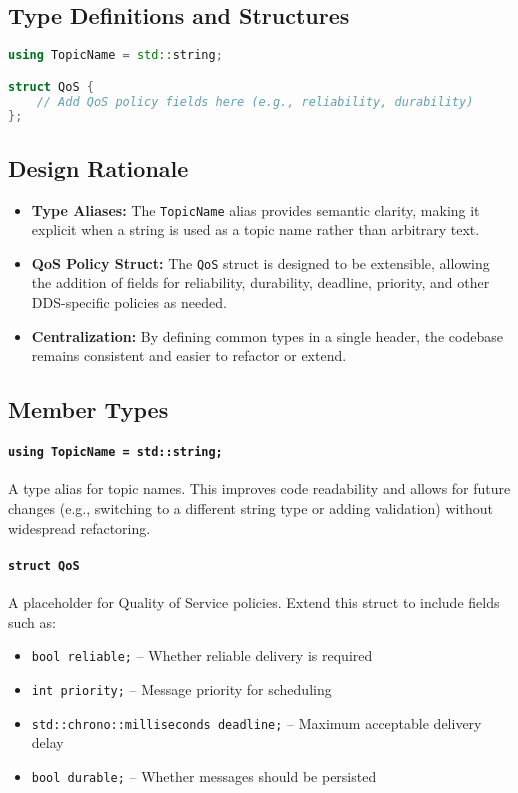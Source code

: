 \documentclass[12pt]{report}
\begin{document}
\subsection{Type Definitions and Structures}
\begin{lstlisting}[language=C++]
using TopicName = std::string;

struct QoS {
    // Add QoS policy fields here (e.g., reliability, durability)
};
\end{lstlisting}

\subsection{Design Rationale}
\begin{itemize}
    \item \textbf{Type Aliases:} The \texttt{TopicName} alias provides semantic clarity, making it explicit when a string is used as a topic name rather than arbitrary text.
    \item \textbf{QoS Policy Struct:} The \texttt{QoS} struct is designed to be extensible, allowing the addition of fields for reliability, durability, deadline, priority, and other DDS-specific policies as needed.
    \item \textbf{Centralization:} By defining common types in a single header, the codebase remains consistent and easier to refactor or extend.
\end{itemize}

\subsection{Member Types}
\paragraph{\texttt{using TopicName = std::string;}}
A type alias for topic names. This improves code readability and allows for future changes (e.g., switching to a different string type or adding validation) without widespread refactoring.

\paragraph{\texttt{struct QoS}}
A placeholder for Quality of Service policies. Extend this struct to include fields such as:
\begin{itemize}
    \item \texttt{bool reliable;} -- Whether reliable delivery is required
    \item \texttt{int priority;} -- Message priority for scheduling
    \item \texttt{std::chrono::milliseconds deadline;} -- Maximum acceptable delivery delay
    \item \texttt{bool durable;} -- Whether messages should be persisted
\end{itemize}
\end{document}
